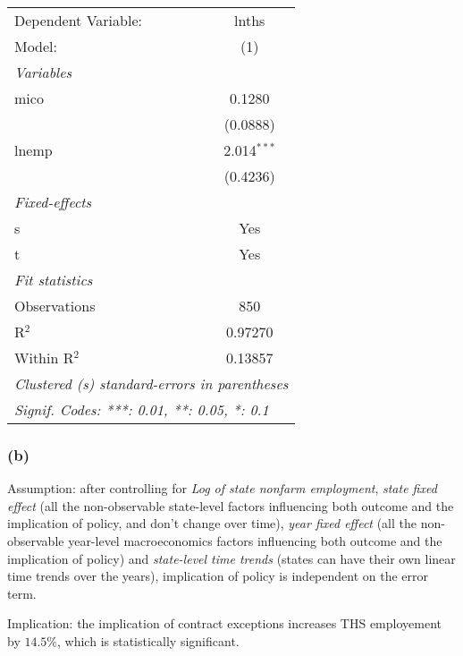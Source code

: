 \documentclass[
]{article}
\begin{document}
\begin{center}\begingroup\centering\begin{tabular}{lc}   \tabularnewline \midrule \midrule   Dependent Variable: & lnths\\     Model:              & (1)\\     \midrule   \emph{Variables}\\   mico                & 0.1280\\                          & (0.0888)\\      lnemp               & 2.014$^{***}$\\                          & (0.4236)\\      \midrule   \emph{Fixed-effects}\\   s                   & Yes\\     t                   & Yes\\     \midrule   \emph{Fit statistics}\\   Observations        & 850\\     R$^2$               & 0.97270\\     Within R$^2$        & 0.13857\\     \midrule \midrule   \multicolumn{2}{l}{\emph{Clustered (s) standard-errors in parentheses}}\\   \multicolumn{2}{l}{\emph{Signif. Codes: ***: 0.01, **: 0.05, *: 0.1}}\\\end{tabular}\par\endgroup\end{center}

\hypertarget{b-2}{%
\subsubsection{(b)}\label{b-2}}

Assumption: after controlling for \emph{Log of state nonfarm
employment}, \emph{state fixed effect} (all the non-observable
state-level factors influencing both outcome and the implication of
policy, and don't change over time), \emph{year fixed effect} (all the
non-observable year-level macroeconomics factors influencing both
outcome and the implication of policy) and \emph{state-level time
trends} (states can have their own linear time trends over the years),
implication of policy is independent on the error term.

Implication: the implication of contract exceptions increases THS
employement by \(14.5\%\), which is statistically significant.
\end{document}
